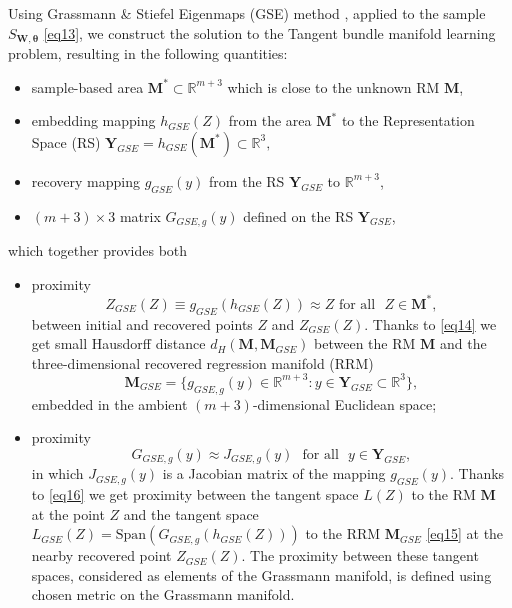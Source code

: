 \documentclass[conference]{IEEEtran} %
\def\mbtheta{{\bm\theta}}
\def\mbM{\mathbf{M}}
\def\mbY{\mathbf{Y}}
\def\RR{\mathbb{R}}
\begin{document}
Using Grassmann \& Stiefel Eigenmaps (GSE) method \cite{bib21,bib22}, applied to the sample $S_{\mathbf{W},\mbtheta}$ \eqref{eq13}, we construct the solution to the Tangent bundle manifold learning problem, resulting in the following quantities:
\begin{itemize}
	\item
    	sample-based area $\mbM^* \subset \RR^{m+3}$ which is close to the unknown RM $\mbM$,
      \item
      	embedding mapping $h_{GSE}(Z)$ from the area $\mbM^*$ to the Representation Space (RS) $\mbY_{GSE} = h_{GSE}(\mbM^*)\subset\RR^3,$
  \item
  	recovery mapping $g_{GSE}(y)$ from the RS $\mbY_{GSE}$ to $\RR^{m+3}$,
  \item
  	$(m+3)\times 3$ matrix $G_{GSE,g}(y)$ defined on the RS $\mbY_{GSE}$,
\end{itemize}
which together provides both
\begin{itemize}
\item proximity
\begin{equation}
\label{eq14}
	Z_{GSE}(Z) \equiv g_{GSE}(h_{GSE}(Z)) \approx Z\,\,\mbox{for all }\,\,Z \in \mbM^*,
\end{equation}
between initial and recovered points $Z$ and $Z_{GSE}(Z)$. Thanks to \eqref{eq14} we get small Hausdorff distance $d_H(\mbM, \mbM_{GSE})$ between the RM $\mbM$ and the three-dimensional recovered regression manifold (RRM)
\begin{equation}
\label{eq15}
	\mbM_{GSE} = \{g_{GSE,g}(y) \in \RR^{m+3}: y \in \mbY_{GSE}\subset\RR^3\},
 \end{equation}
embedded in the ambient $(m+3)$-dimensional Euclidean space;
\item proximity
\begin{equation}
\label{eq16}
	G_{GSE,g}(y) \approx J_{GSE,g}(y)\,\,\mbox{ for all }\,\, y \in \mbY_{GSE},
\end{equation}
in which $J_{GSE,g}(y)$ is a Jacobian matrix of the mapping $g_{GSE}(y)$. Thanks to \eqref{eq16} we get proximity between the tangent space $L(Z)$ to the RM $\mbM$ at the point $Z$ and the tangent space $L_{GSE}(Z) = \mathrm{Span}(G_{GSE,g}(h_{GSE}(Z)))$ to the RRM $\mbM_{GSE}$ \eqref{eq15} at the nearby recovered point $Z_{GSE}(Z)$. The proximity between these tangent spaces, considered as elements of the Grassmann manifold, is defined using chosen metric on the Grassmann manifold.
\end{itemize}
\end{document}
